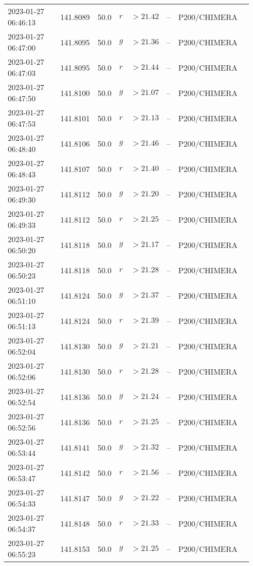 \documentclass{nature_plusfigure}
\begin{document}
\begin{supplement}
\begin{center}
\begin{longtable}{llllllll}
2023-01-27 06:46:13 & 141.8089 & 50.0 & $r$ & $>21.42$ & -- & P200/CHIMERA &  \\ 
2023-01-27 06:47:00 & 141.8095 & 50.0 & $g$ & $>21.36$ & -- & P200/CHIMERA &  \\ 
2023-01-27 06:47:03 & 141.8095 & 50.0 & $r$ & $>21.44$ & -- & P200/CHIMERA &  \\ 
2023-01-27 06:47:50 & 141.8100 & 50.0 & $g$ & $>21.07$ & -- & P200/CHIMERA &  \\ 
2023-01-27 06:47:53 & 141.8101 & 50.0 & $r$ & $>21.13$ & -- & P200/CHIMERA &  \\ 
2023-01-27 06:48:40 & 141.8106 & 50.0 & $g$ & $>21.46$ & -- & P200/CHIMERA &  \\ 
2023-01-27 06:48:43 & 141.8107 & 50.0 & $r$ & $>21.40$ & -- & P200/CHIMERA &  \\ 
2023-01-27 06:49:30 & 141.8112 & 50.0 & $g$ & $>21.20$ & -- & P200/CHIMERA &  \\ 
2023-01-27 06:49:33 & 141.8112 & 50.0 & $r$ & $>21.25$ & -- & P200/CHIMERA &  \\ 
2023-01-27 06:50:20 & 141.8118 & 50.0 & $g$ & $>21.17$ & -- & P200/CHIMERA &  \\ 
2023-01-27 06:50:23 & 141.8118 & 50.0 & $r$ & $>21.28$ & -- & P200/CHIMERA &  \\ 
2023-01-27 06:51:10 & 141.8124 & 50.0 & $g$ & $>21.37$ & -- & P200/CHIMERA &  \\ 
2023-01-27 06:51:13 & 141.8124 & 50.0 & $r$ & $>21.39$ & -- & P200/CHIMERA &  \\ 
2023-01-27 06:52:04 & 141.8130 & 50.0 & $g$ & $>21.21$ & -- & P200/CHIMERA &  \\ 
2023-01-27 06:52:06 & 141.8130 & 50.0 & $r$ & $>21.28$ & -- & P200/CHIMERA &  \\ 
2023-01-27 06:52:54 & 141.8136 & 50.0 & $g$ & $>21.24$ & -- & P200/CHIMERA &  \\ 
2023-01-27 06:52:56 & 141.8136 & 50.0 & $r$ & $>21.25$ & -- & P200/CHIMERA &  \\ 
2023-01-27 06:53:44 & 141.8141 & 50.0 & $g$ & $>21.32$ & -- & P200/CHIMERA &  \\ 
2023-01-27 06:53:47 & 141.8142 & 50.0 & $r$ & $>21.56$ & -- & P200/CHIMERA &  \\ 
2023-01-27 06:54:33 & 141.8147 & 50.0 & $g$ & $>21.22$ & -- & P200/CHIMERA &  \\ 
2023-01-27 06:54:37 & 141.8148 & 50.0 & $r$ & $>21.33$ & -- & P200/CHIMERA &  \\ 
2023-01-27 06:55:23 & 141.8153 & 50.0 & $g$ & $>21.25$ & -- & P200/CHIMERA &  \\ 

\end{longtable}
\end{center}
\end{supplement}
\end{document}
